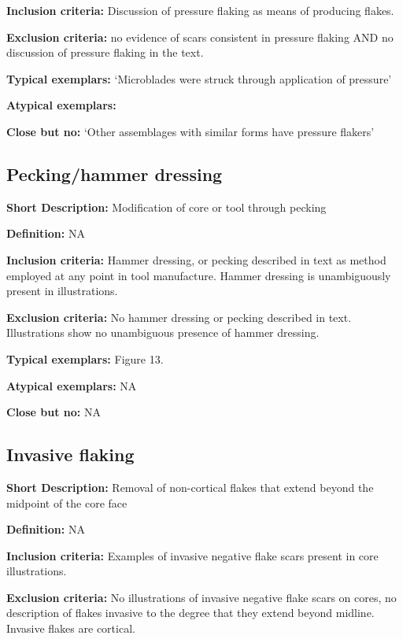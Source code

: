\documentclass[
]{article}
\begin{document}
\textbf{Inclusion criteria:} Discussion of pressure flaking as means of
producing flakes.

\textbf{Exclusion criteria:} no evidence of scars consistent in pressure
flaking AND no discussion of pressure flaking in the text.

\textbf{Typical exemplars:} `Microblades were struck through application
of pressure'

\textbf{Atypical exemplars:}

\textbf{Close but no:} `Other assemblages with similar forms have
pressure flakers'

\hypertarget{peckinghammer-dressing}{%
\subsection{Pecking/hammer dressing}\label{peckinghammer-dressing}}

\textbf{Short Description:} Modification of core or tool through pecking

\textbf{Definition:} NA

\textbf{Inclusion criteria:} Hammer dressing, or pecking described in
text as method employed at any point in tool manufacture. Hammer
dressing is unambiguously present in illustrations.

\textbf{Exclusion criteria:} No hammer dressing or pecking described in
text. Illustrations show no unambiguous presence of hammer dressing.

\textbf{Typical exemplars:} Figure 13.

\textbf{Atypical exemplars:} NA

\textbf{Close but no:} NA

\hypertarget{invasive-flaking}{%
\subsection{Invasive flaking}\label{invasive-flaking}}

\textbf{Short Description:} Removal of non-cortical flakes that extend
beyond the midpoint of the core face

\textbf{Definition:} NA

\textbf{Inclusion criteria:} Examples of invasive negative flake scars
present in core illustrations.

\textbf{Exclusion criteria:} No illustrations of invasive negative flake
scars on cores, no description of flakes invasive to the degree that
they extend beyond midline. Invasive flakes are cortical.
\end{document}
